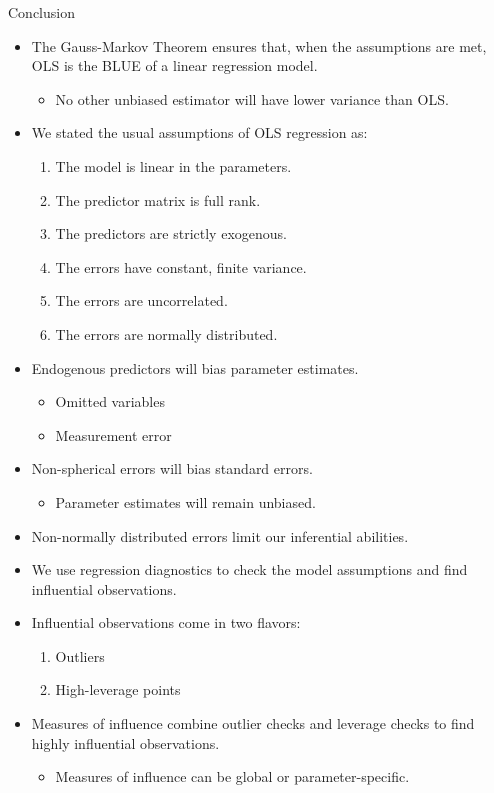 \documentclass{beamer}\usepackage[]{graphicx}\usepackage[]{color}
\begin{document}

\begin{frame}[allowframebreaks]{Conclusion}
  
  \begin{itemize}
  \item The Gauss-Markov Theorem ensures that, when the assumptions are met, OLS 
    is the BLUE of a linear regression model.
    \begin{itemize}
    \item No other unbiased estimator will have lower variance than OLS.
    \end{itemize}
    \vb
  \item We stated the usual assumptions of OLS regression as:
    \begin{enumerate}
    \item The model is linear in the parameters.
    \item The predictor matrix is full rank.
    \item The predictors are strictly exogenous.
    \item The errors have constant, finite variance.
    \item The errors are uncorrelated.
    \item The errors are normally distributed.
    \end{enumerate}
    \vb
  \item Endogenous predictors will bias parameter estimates.
    \begin{itemize}
    \item Omitted variables
    \item Measurement error
    \end{itemize}
    
    \pagebreak
    
  \item Non-spherical errors will bias standard errors.
    \begin{itemize}
    \item Parameter estimates will remain unbiased.
    \end{itemize}
    \vb
  \item Non-normally distributed errors limit our inferential abilities.
    \vb
  \item We use regression diagnostics to check the model assumptions and find 
    influential observations.
    \vb
  \item Influential observations come in two flavors:
    \begin{enumerate}
    \item Outliers
    \item High-leverage points
    \end{enumerate}
    \vb
  \item Measures of influence combine outlier checks and leverage checks to find 
    highly influential observations.
    \begin{itemize}
    \item Measures of influence can be global or parameter-specific.
    \end{itemize}
  \end{itemize}
  

\end{frame}
\end{document}
